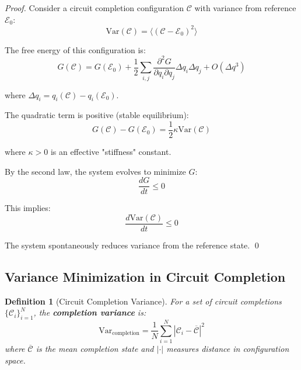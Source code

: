 \documentclass[12pt,a4paper]{article}
\newtheorem{definition}{Definition}
\begin{document}
\begin{proof}
Consider a circuit completion configuration $\mathcal{C}$ with variance from reference $\mathcal{E}_0$:
\begin{equation}
\text{Var}(\mathcal{C}) = \langle (\mathcal{C} - \mathcal{E}_0)^2 \rangle
\end{equation}

The free energy of this configuration is:
\begin{equation}
G(\mathcal{C}) = G(\mathcal{E}_0) + \frac{1}{2} \sum_{i,j} \frac{\partial^2 G}{\partial q_i \partial q_j} \Delta q_i \Delta q_j + O(\Delta q^3)
\end{equation}

where $\Delta q_i = q_i(\mathcal{C}) - q_i(\mathcal{E}_0)$.

The quadratic term is positive (stable equilibrium):
\begin{equation}
G(\mathcal{C}) - G(\mathcal{E}_0) = \frac{1}{2} \kappa \text{Var}(\mathcal{C})
\end{equation}

where $\kappa > 0$ is an effective "stiffness" constant.

By the second law, the system evolves to minimize $G$:
\begin{equation}
\frac{dG}{dt} \leq 0
\end{equation}

This implies:
\begin{equation}
\frac{d\text{Var}(\mathcal{C})}{dt} \leq 0
\end{equation}

The system spontaneously reduces variance from the reference state. \qed
\end{proof}

\subsection{Variance Minimization in Circuit Completion}

\begin{definition}[Circuit Completion Variance]
\label{def:completion_variance}
For a set of circuit completions $\{\mathcal{C}_i\}_{i=1}^{N}$, the \textbf{completion variance} is:
\begin{equation}
\text{Var}_{\text{completion}} = \frac{1}{N} \sum_{i=1}^{N} |\mathcal{C}_i - \overline{\mathcal{C}}|^2
\end{equation}
where $\overline{\mathcal{C}}$ is the mean completion state and $|\cdot|$ measures distance in configuration space.
\end{definition}
\end{document}
